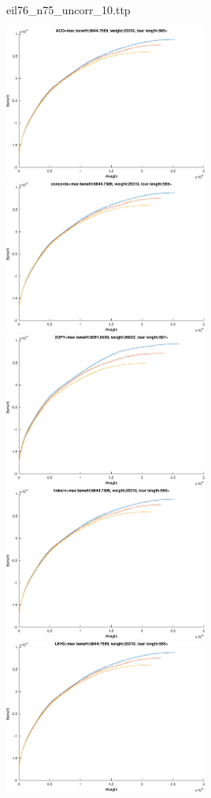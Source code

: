 \documentclass{article}
\begin{document}
\newpage
eil76\_n75\_uncorr\_10.ttp

\noindent
\includegraphics[width=0.5\textwidth]{eil76figs/eil76_n75_uncorr_10.ttp.aco.txt.atsf.eps}
\includegraphics[width=0.5\textwidth]{eil76figs/eil76_n75_uncorr_10.ttp.con.txt.atsf.eps}
\includegraphics[width=0.5\textwidth]{eil76figs/eil76_n75_uncorr_10.ttp.inv.txt.atsf.eps}
\includegraphics[width=0.5\textwidth]{eil76figs/eil76_n75_uncorr_10.ttp.lkh.txt.atsf.eps}
\includegraphics[width=0.5\textwidth]{eil76figs/eil76_n75_uncorr_10.ttp.lkh2.txt.atsf.eps}
\end{document}
